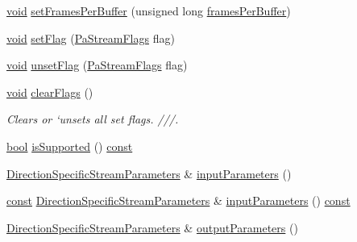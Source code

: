 \begin{DoxyCompactItemize}
\item 
\hyperlink{sound_8c_ae35f5844602719cf66324f4de2a658b3}{void} \hyperlink{classportaudio_1_1_stream_parameters_a99647981a8bea195f6514b9a8a598c8e}{set\+Frames\+Per\+Buffer} (unsigned long \hyperlink{classportaudio_1_1_stream_parameters_a537f89fa6f1fcc750bad7cb961bb44ab}{frames\+Per\+Buffer})
\item 
\hyperlink{sound_8c_ae35f5844602719cf66324f4de2a658b3}{void} \hyperlink{classportaudio_1_1_stream_parameters_a6995197ed506fd468f6d36bce7ac8b96}{set\+Flag} (\hyperlink{portaudio_8h_a37c7ac3ace7d2dd1430f40ecdee4ebb6}{Pa\+Stream\+Flags} flag)
\item 
\hyperlink{sound_8c_ae35f5844602719cf66324f4de2a658b3}{void} \hyperlink{classportaudio_1_1_stream_parameters_a9d6ccd3e4c6ba2c6341282176d32e9bb}{unset\+Flag} (\hyperlink{portaudio_8h_a37c7ac3ace7d2dd1430f40ecdee4ebb6}{Pa\+Stream\+Flags} flag)
\item 
\hyperlink{sound_8c_ae35f5844602719cf66324f4de2a658b3}{void} \hyperlink{classportaudio_1_1_stream_parameters_a6d53ec7c9c1828f838fe423897344d12}{clear\+Flags} ()
\begin{DoxyCompactList}\small\item\em Clears or `unsets\textquotesingle{} all set flags. ///. \end{DoxyCompactList}\item 
\hyperlink{mac_2config_2i386_2lib-src_2libsoxr_2soxr-config_8h_abb452686968e48b67397da5f97445f5b}{bool} \hyperlink{classportaudio_1_1_stream_parameters_a28f58707bd5ea1091db8513d0f7fa7ac}{is\+Supported} () \hyperlink{getopt1_8c_a2c212835823e3c54a8ab6d95c652660e}{const} 
\item 
\hyperlink{classportaudio_1_1_direction_specific_stream_parameters}{Direction\+Specific\+Stream\+Parameters} \& \hyperlink{classportaudio_1_1_stream_parameters_ae542d042811e1ed75b3d6b3ce5882129}{input\+Parameters} ()
\item 
\hyperlink{getopt1_8c_a2c212835823e3c54a8ab6d95c652660e}{const} \hyperlink{classportaudio_1_1_direction_specific_stream_parameters}{Direction\+Specific\+Stream\+Parameters} \& \hyperlink{classportaudio_1_1_stream_parameters_aab63c4457db0e85b4e92e8bc539e43cd}{input\+Parameters} () \hyperlink{getopt1_8c_a2c212835823e3c54a8ab6d95c652660e}{const} 
\item 
\hyperlink{classportaudio_1_1_direction_specific_stream_parameters}{Direction\+Specific\+Stream\+Parameters} \& \hyperlink{classportaudio_1_1_stream_parameters_a9367d27c08eb1c5af6ded564f76be116}{output\+Parameters} ()
\item 

\end{DoxyCompactItemize}
